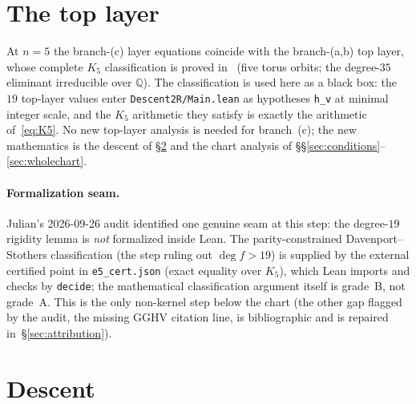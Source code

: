 \documentclass[a4paper,11pt]{article}
\theoremstyle{plain}
\theoremstyle{definition}
\theoremstyle{remark}
\begin{document}
\section{The top layer}\label{sec:top}

At $n=5$ the branch-(c) layer equations coincide with the branch-(a,b) top layer, whose complete $K_5$ classification is proved in~\cite{BranchABv19} (five torus orbits; the degree-$35$ eliminant irreducible over $\mathbb{Q}$). The classification is used here as a black box: the $19$ top-layer values enter \texttt{Descent2R/Main.lean} as hypotheses \texttt{h\_v} at minimal integer scale, and the $K_5$ arithmetic they satisfy is exactly the arithmetic of~\eqref{eq:K5}. No new top-layer analysis is needed for branch~(c); the new mathematics is the descent of \S\ref{sec:descent} and the chart analysis of \S\S\ref{sec:conditions}--\ref{sec:wholechart}.

\paragraph{Formalization seam.} Julian's 2026-09-26 audit identified one genuine seam at this step: the degree-$19$ rigidity lemma is \emph{not} formalized inside Lean. The parity-constrained Davenport--Stothers classification (the step ruling out $\deg f > 19$) is supplied by the external certified point in \texttt{e5\_cert.json} (exact equality over $K_5$), which Lean imports and checks by \texttt{decide}; the mathematical classification argument itself is grade~B, not grade~A. This is the only non-kernel step below the chart (the other gap flagged by the audit, the missing GGHV citation line, is bibliographic and is repaired in~\S\ref{sec:attribution}).

\section{Descent}\label{sec:descent}
\end{document}
